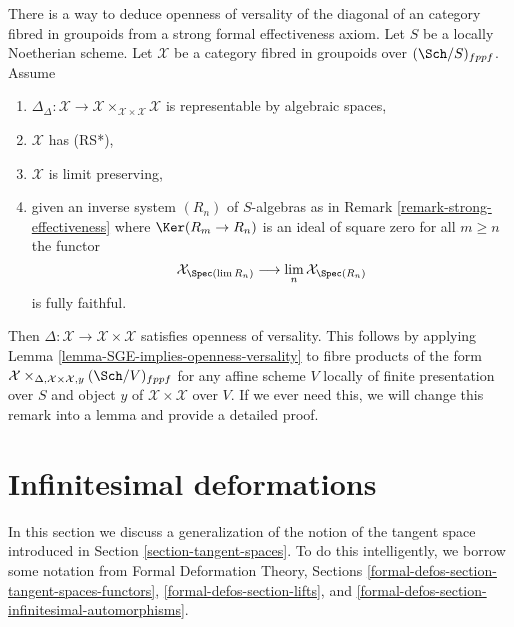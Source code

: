 \begin{remark}
\label{remark-trade-openness-versality-diagonal-with-strong-effectiveness}
There is a way to deduce openness of versality of the diagonal
of an category fibred in groupoids from a strong formal effectiveness
axiom.
Let $S$ be a locally Noetherian scheme. Let $\mathcal{X}$ be a category fibred
in groupoids over $(\Sch/S)_{fppf}$. Assume
\begin{enumerate}
\item $\Delta_\Delta : \mathcal{X} \to
\mathcal{X} \times_{\mathcal{X} \times \mathcal{X}} \mathcal{X}$
is representable by algebraic spaces,
\item $\mathcal{X}$ has (RS*),
\item $\mathcal{X}$ is limit preserving,
\item given an inverse system $(R_n)$ of $S$-algebras
as in Remark \ref{remark-strong-effectiveness}
where $\Ker(R_m \to R_n)$ is an ideal of square zero for all $m \geq n$
the functor
$$
\mathcal{X}_{\Spec(\lim R_n)} \longrightarrow
\lim_n \mathcal{X}_{\Spec(R_n)}
$$
is fully faithful.
\end{enumerate}
Then $\Delta : \mathcal{X} \to \mathcal{X} \times \mathcal{X}$
satisfies openness of versality. This follows by applying
Lemma \ref{lemma-SGE-implies-openness-versality}
to fibre products of the form
$\mathcal{X} \times_{\Delta, \mathcal{X} \times \mathcal{X}, y}
(\Sch/V)_{fppf}$ for any affine scheme $V$ locally
of finite presentation over $S$ and object $y$ of
$\mathcal{X} \times \mathcal{X}$ over $V$.
If we ever need this, we will change this remark into
a lemma and provide a detailed proof.
\end{remark}











\section{Infinitesimal deformations}
\label{section-inf}

\noindent
In this section we discuss a generalization of the notion of the
tangent space introduced in Section \ref{section-tangent-spaces}.
To do this intelligently, we borrow some notation from
Formal Deformation Theory, Sections
\ref{formal-defos-section-tangent-spaces-functors},
\ref{formal-defos-section-lifts}, and
\ref{formal-defos-section-infinitesimal-automorphisms}.

